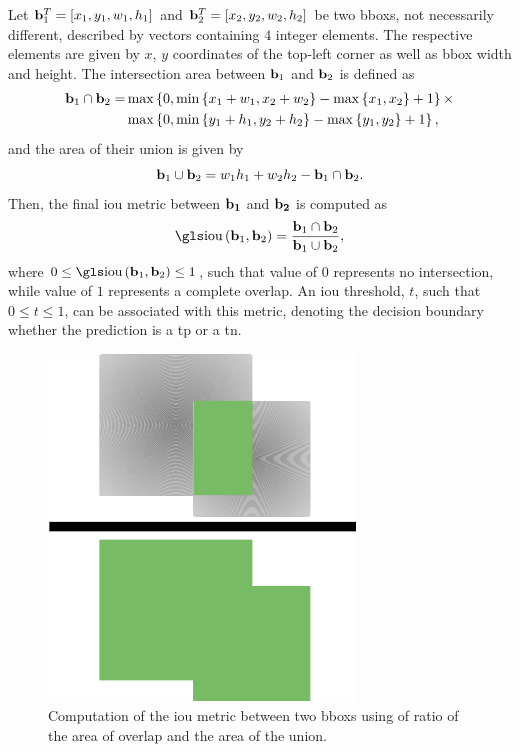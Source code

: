 Let ${\mathbf{b}}_{1}^{T} = \left[ {x_1, y_1, w_1, h_1} \right]$ and ${\mathbf{b}}_{2}^{T} = \left[ {x_2, y_2, w_2, h_2} \right]$ be two \glspl{bbox}, not necessarily different, described by vectors containing $4$ integer elements. The respective elements are given by $x$, $y$ coordinates of the top-left corner as well as \gls{bbox} width and height. The intersection area between $\mathbf{b}_1$ and $\mathbf{b}_2$ is defined as
\begin{equation}
\begin{aligned}
    \mathbf{b}_1 \cap \mathbf{b}_2 =
    &\max \left\{ {0,
                    \min \left\{ {x_1 + w_1, x_2 + w_2} \right\} - \max \left\{ {x_1, x_2} \right\} + 1} \right\}
    \times\\
    &\max \left\{ {0,
                    \min \left\{ {y_1 + h_1, y_2 + h_2} \right\} - \max \left\{ {y_1, y_2} \right\} + 1} \right\},
\end{aligned}
\end{equation}
and the area of their union is given by
\begin{equation}
    \mathbf{b}_1 \cup \mathbf{b}_2 = w_1 h_1 + w_2 h_2 - \mathbf{b}_1 \cap \mathbf{b}_2.
\end{equation}
Then, the final \gls{iou} metric between $\mathbf{b_1}$ and $\mathbf{b_2}$ is computed as
\begin{equation}
    \label{eq:IntersectionOverUnion}
    \func{\IOU}{\vect{b}_1, \vect{b}_2} =
    \frac{\vect{b}_1 \cap \vect{b}_2}{\vect{b}_1 \cup \vect{b}_2},
\end{equation}
where $0 \leq \func{\IOU}{\vect{b}_1, \vect{b}_2} \leq 1$, such that value of $0$ represents no intersection, while value of $1$ represents a complete overlap. An \gls{iou} threshold, $t$, such that $0 \leq t \leq 1$, can be associated with this metric, denoting the decision boundary whether the prediction is a \gls{tp} or a \gls{tn}.

\begin{figure}[t]
    \centerline{\includegraphics[width=0.25\linewidth]{figures/theoretical_foundations/intersection_over_union.pdf}}
    \caption[\Gls{iou} visualization]{Computation of the \gls{iou} metric between two \glspl{bbox} using of ratio of the area of overlap and the area of the union.}
    \label{fig:IntersectionOverUnion}
\end{figure}

